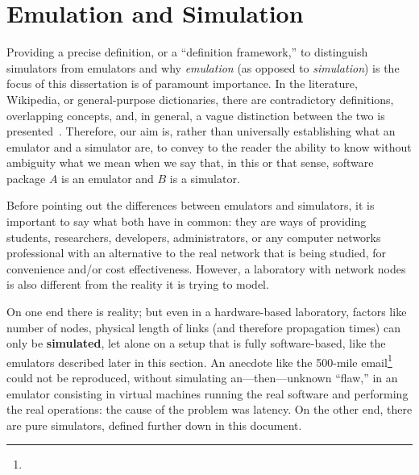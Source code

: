 \section{Emulation and Simulation}
\label{sec:leavingemulationandsimulation}

Providing a precise definition, or a ``definition framework,'' to distinguish simulators from emulators and why \emph{emulation} (as opposed to \emph{simulation}) is the focus of this dissertation is of paramount importance.
In the literature, Wikipedia, or general-purpose dictionaries, there are contradictory definitions, overlapping concepts, and, in general, a vague distinction between the two is presented~\cite{netsimoremu}.
Therefore, our aim is, rather than universally establishing what an emulator and a simulator are, to convey to the reader the ability to know without ambiguity what we mean when we say that, in this or that sense, software package $A$ is an emulator and $B$ is a simulator.

Before pointing out the differences between emulators and simulators, it is important to say what both have in common: they are ways of providing students, researchers, developers, administrators, or any computer networks professional with an alternative to the real network that is being studied, for convenience and/or cost effectiveness.
However, a laboratory with network nodes is also different from the reality it is trying to model.

On one end there is reality; but even in a hardware-based laboratory, factors like number of nodes, physical length of links (and therefore propagation times) can only be \textbf{simulated}, let alone on a setup that is fully software-based, like the emulators described later in this section.
An anecdote like the 500-mile email\footnote{} could not be reproduced, without simulating an---then---unknown ``flaw,'' in an emulator consisting in virtual machines running the real software and performing the real operations: the cause of the problem was latency.
On the other end, there are pure simulators, defined further down in this document.


